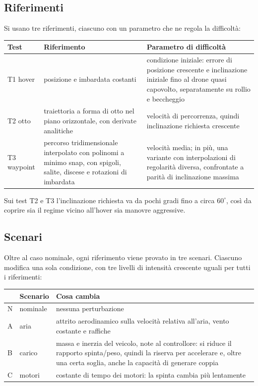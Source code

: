 \documentclass[11pt,a4paper]{article}
\begin{document}
\subsection{Riferimenti}

Si usano tre riferimenti, ciascuno con un parametro che ne regola la difficoltà:

\begin{center}
\begin{tabularx}{\textwidth}{@{}l L L@{}}
\toprule
Test & Riferimento & Parametro di difficoltà \\
\midrule
T1 hover & posizione e imbardata costanti & condizione iniziale: errore di posizione crescente e inclinazione iniziale fino al drone quasi capovolto, separatamente su rollio e beccheggio \\ \addlinespace
T2 otto & traiettoria a forma di otto nel piano orizzontale, con derivate analitiche & velocità di percorrenza, quindi inclinazione richiesta crescente \\ \addlinespace
T3 waypoint & percorso tridimensionale interpolato con polinomi a minimo snap, con spigoli, salite, discese e rotazioni di imbardata & velocità media; in più, una variante con interpolazioni di regolarità diversa, confrontate a parità di inclinazione massima \\
\bottomrule
\end{tabularx}
\end{center}

Sui test T2 e T3 l'inclinazione richiesta va da pochi gradi fino a circa \(60^\circ\), così da coprire sia il regime vicino all'hover sia manovre aggressive.

\subsection{Scenari}

Oltre al caso nominale, ogni riferimento viene provato in tre scenari. Ciascuno modifica una sola condizione, con tre livelli di intensità crescente uguali per tutti i riferimenti:

\begin{center}
\begin{tabularx}{\textwidth}{@{}l l L@{}}
\toprule
 & Scenario & Cosa cambia \\
\midrule
N & nominale & nessuna perturbazione \\ \addlinespace
A & aria & attrito aerodinamico sulla velocità relativa all'aria, vento costante e raffiche \\ \addlinespace
B & carico & massa e inerzia del veicolo, note al controllore: si riduce il rapporto spinta/peso, quindi la riserva per accelerare e, oltre una certa soglia, anche la capacità di generare coppia \\ \addlinespace
C & motori & costante di tempo dei motori: la spinta cambia più lentamente \\
\bottomrule
\end{tabularx}
\end{center}
\end{document}
